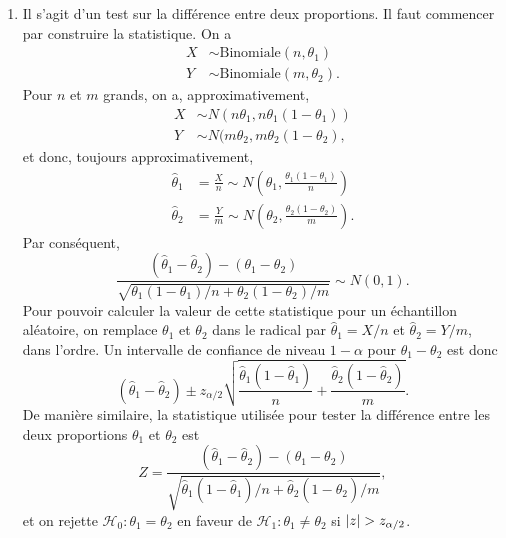 \begin{solution}{6.10}
    \begin{enumerate}
    \item Il s'agit d'un test sur la différence entre deux
      proportions. Il faut commencer par construire la statistique. On
      a
      \begin{align*}
        X &\sim \text{Binomiale}(n, \theta_1)\\
        Y &\sim \text{Binomiale}(m, \theta_2).
      \end{align*}
      Pour $n$ et $m$ grands, on a, approximativement,
      \begin{align*}
        X &\sim N(n\theta_1, n\theta_1(1 - \theta_1)) \\
        Y &\sim N(m\theta_2, m\theta_2(1 - \theta_2),
      \end{align*}
      et donc, toujours approximativement,
      \begin{align*}
        \hat{\theta}_1 &= \frac{X}{n}
        \sim N\left(\theta_1,
          \frac{\theta_1(1-\theta_1)}{n}\right) \\
        \hat{\theta}_2 &= \frac{Y}{m}
        \sim N\left(\theta_2, \frac{\theta_2(1-\theta_2)}{m}\right).
      \end{align*}
      Par conséquent,
      \begin{displaymath}
        \frac{(\hat{\theta}_1 - \hat{\theta}_2) - (\theta_1 -
          \theta_2)}{\sqrt{\theta_1(1-\theta_1)/n +
            \theta_2(1-\theta_2)/m}} \sim N(0, 1).
      \end{displaymath}
      Pour pouvoir calculer la valeur de cette statistique pour un
      échantillon aléatoire, on remplace $\theta_1$ et $\theta_2$ dans
      le radical par $\hat{\theta}_1 = X/n$ et $\hat{\theta}_2 = Y/m$,
      dans l'ordre. Un intervalle de confiance de niveau $1 - \alpha$
      pour $\theta_1 - \theta_2$ est donc
      \begin{displaymath}
        (\hat{\theta}_1 - \hat{\theta}_2) \pm
        z_{\alpha/2} \sqrt{\frac{\hat{\theta}_1 (1 - \hat{\theta}_1)}{n} +
          \frac{\hat{\theta}_2 (1 - \hat{\theta}_2)}{m}}.
      \end{displaymath}
      De manière similaire, la statistique utilisée pour tester la
      différence entre les deux proportions $\theta_1$ et $\theta_2$ est
      \begin{displaymath}
        Z =  \frac{(\hat{\theta}_1 - \hat{\theta}_2) - (\theta_1 -
          \theta_2)}{\sqrt{\hat{\theta}_1 (1 - \hat{\theta}_1)/n +
            \hat{\theta}_2 (1 - \hat{\theta}_2)/m}},
      \end{displaymath}
      et on rejette $ \mathcal{H}_0: \theta_1 = \theta_2$ en faveur de $ \mathcal{H}_1:
      \theta_1 \ne \theta_2$ si $\lvert z \rvert > z_{\alpha/2}$.


\end{enumerate}
\end{solution}
